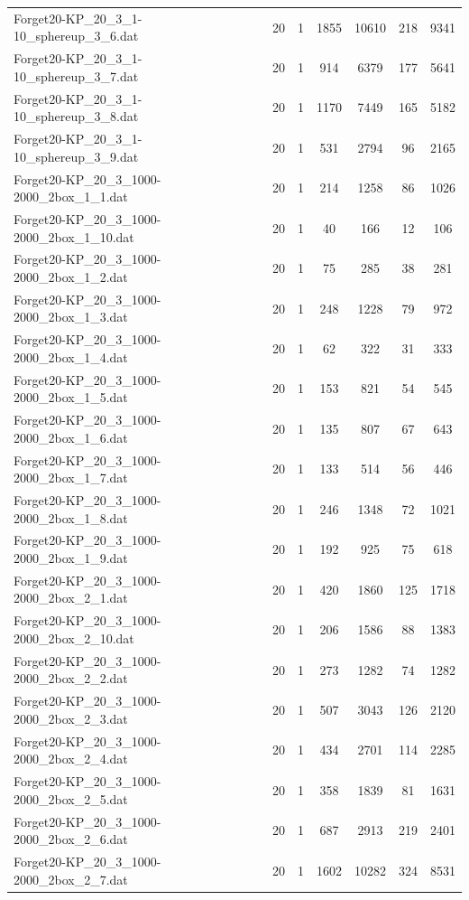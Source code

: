 \begin{table}[!ht]
\begin{tabular}{lcccccc}
Forget20-KP\_20\_3\_1-10\_sphereup\_3\_6.dat & 20 & 1 & 1855 & 10610 & 218 & 9341 \\
Forget20-KP\_20\_3\_1-10\_sphereup\_3\_7.dat & 20 & 1 & 914 & 6379 & 177 & 5641 \\
Forget20-KP\_20\_3\_1-10\_sphereup\_3\_8.dat & 20 & 1 & 1170 & 7449 & 165 & 5182 \\
Forget20-KP\_20\_3\_1-10\_sphereup\_3\_9.dat & 20 & 1 & 531 & 2794 & 96 & 2165 \\
Forget20-KP\_20\_3\_1000-2000\_2box\_1\_1.dat & 20 & 1 & 214 & 1258 & 86 & 1026 \\
Forget20-KP\_20\_3\_1000-2000\_2box\_1\_10.dat & 20 & 1 & 40 & 166 & 12 & 106 \\
Forget20-KP\_20\_3\_1000-2000\_2box\_1\_2.dat & 20 & 1 & 75 & 285 & 38 & 281 \\
Forget20-KP\_20\_3\_1000-2000\_2box\_1\_3.dat & 20 & 1 & 248 & 1228 & 79 & 972 \\
Forget20-KP\_20\_3\_1000-2000\_2box\_1\_4.dat & 20 & 1 & 62 & 322 & 31 & 333 \\
Forget20-KP\_20\_3\_1000-2000\_2box\_1\_5.dat & 20 & 1 & 153 & 821 & 54 & 545 \\
Forget20-KP\_20\_3\_1000-2000\_2box\_1\_6.dat & 20 & 1 & 135 & 807 & 67 & 643 \\
Forget20-KP\_20\_3\_1000-2000\_2box\_1\_7.dat & 20 & 1 & 133 & 514 & 56 & 446 \\
Forget20-KP\_20\_3\_1000-2000\_2box\_1\_8.dat & 20 & 1 & 246 & 1348 & 72 & 1021 \\
Forget20-KP\_20\_3\_1000-2000\_2box\_1\_9.dat & 20 & 1 & 192 & 925 & 75 & 618 \\
Forget20-KP\_20\_3\_1000-2000\_2box\_2\_1.dat & 20 & 1 & 420 & 1860 & 125 & 1718 \\
Forget20-KP\_20\_3\_1000-2000\_2box\_2\_10.dat & 20 & 1 & 206 & 1586 & 88 & 1383 \\
Forget20-KP\_20\_3\_1000-2000\_2box\_2\_2.dat & 20 & 1 & 273 & 1282 & 74 & 1282 \\
Forget20-KP\_20\_3\_1000-2000\_2box\_2\_3.dat & 20 & 1 & 507 & 3043 & 126 & 2120 \\
Forget20-KP\_20\_3\_1000-2000\_2box\_2\_4.dat & 20 & 1 & 434 & 2701 & 114 & 2285 \\
Forget20-KP\_20\_3\_1000-2000\_2box\_2\_5.dat & 20 & 1 & 358 & 1839 & 81 & 1631 \\
Forget20-KP\_20\_3\_1000-2000\_2box\_2\_6.dat & 20 & 1 & 687 & 2913 & 219 & 2401 \\
Forget20-KP\_20\_3\_1000-2000\_2box\_2\_7.dat & 20 & 1 & 1602 & 10282 & 324 & 8531 \\

\end{tabular}
\end{table}
